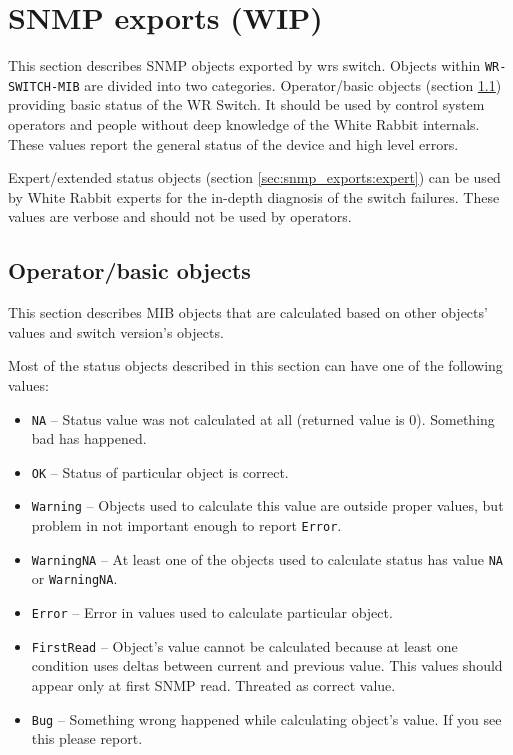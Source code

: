 \section{SNMP exports (WIP)}
\label{sec:snmp_exports}
This section describes SNMP objects exported by wrs switch. Objects within
\texttt{WR\--SWITCH\--MIB} are divided into two categories. Operator/basic objects
(section \ref{sec:snmp_exports:basic}) providing basic status of the WR Switch.
It should be used by control system operators and people without deep knowledge
of the White Rabbit internals. These values report the general status of the
device and high level errors.

Expert/extended status objects (section \ref{sec:snmp_exports:expert})
can be used by White Rabbit experts for the in-depth diagnosis of
the switch failures. These values are verbose and should not be used by
operators.


\subsection{Operator/basic objects}
\label{sec:snmp_exports:basic}
This section describes MIB objects that are calculated based on other objects'
values and switch version's objects.

Most of the status objects described in this section can have one of the
following values:
\begin{itemize}%
  \item \texttt{NA} -- Status value was not calculated at all (returned value
	is 0). Something bad has happened.
  \item \texttt{OK} -- Status of particular object is correct.
  \item \texttt{Warning} -- Objects used to calculate this value are outside
	proper values, but problem in not important enough to report
	\texttt{Error}.
  \item \texttt{WarningNA} -- At least one of the objects used to calculate
	status has value \texttt{NA} or \texttt{WarningNA}.
  \item \texttt{Error} -- Error in values used to calculate particular object.
  \item \texttt{FirstRead} -- Object's value cannot be calculated because at
	least one condition uses deltas between current and previous value.
	This values should appear only at first SNMP read. Threated as correct
	value.
  \item \texttt{Bug} -- Something wrong happened while calculating object's
	value. If you see this please report.
\end{itemize}

